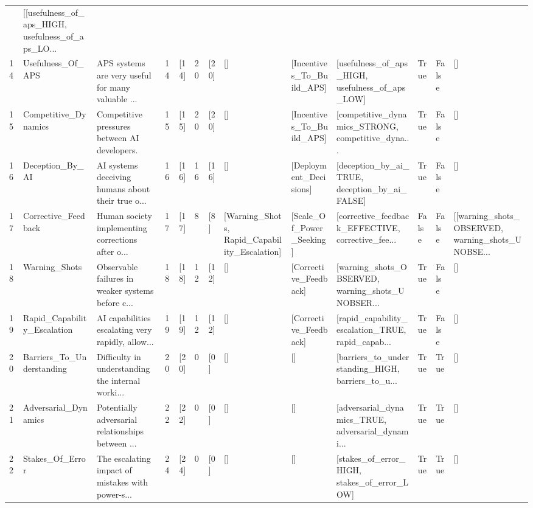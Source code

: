 \documentclass[
  11pt,
  letterpaper,
]{book}
\begin{document}
\begin{longtable}[]{@{}lllllllllllll@{}}
& {[}{[}usefulness\_of\_aps\_HIGH, usefulness\_of\_aps\_LO... \\
14 & Usefulness\_Of\_APS & APS systems are very useful for many valuable
... & 14 & {[}14{]} & 20 & {[}20{]} & {[}{]} &
{[}Incentives\_To\_Build\_APS{]} & {[}usefulness\_of\_aps\_HIGH,
usefulness\_of\_aps\_LOW{]} & True & False & {[}{]} \\
15 & Competitive\_Dynamics & Competitive pressures between AI
developers. & 15 & {[}15{]} & 20 & {[}20{]} & {[}{]} &
{[}Incentives\_To\_Build\_APS{]} & {[}competitive\_dynamics\_STRONG,
competitive\_dyna... & True & False & {[}{]} \\
16 & Deception\_By\_AI & AI systems deceiving humans about their true
o... & 16 & {[}16{]} & 16 & {[}16{]} & {[}{]} &
{[}Deployment\_Decisions{]} & {[}deception\_by\_ai\_TRUE,
deception\_by\_ai\_FALSE{]} & True & False & {[}{]} \\
17 & Corrective\_Feedback & Human society implementing corrections after
o... & 17 & {[}17{]} & 8 & {[}8{]} & {[}Warning\_Shots,
Rapid\_Capability\_Escalation{]} & {[}Scale\_Of\_Power\_Seeking{]} &
{[}corrective\_feedback\_EFFECTIVE, corrective\_fee... & False & False &
{[}{[}warning\_shots\_OBSERVED, warning\_shots\_UNOBSE... \\
18 & Warning\_Shots & Observable failures in weaker systems before c...
& 18 & {[}18{]} & 12 & {[}12{]} & {[}{]} & {[}Corrective\_Feedback{]} &
{[}warning\_shots\_OBSERVED, warning\_shots\_UNOBSER... & True & False &
{[}{]} \\
19 & Rapid\_Capability\_Escalation & AI capabilities escalating very
rapidly, allow... & 19 & {[}19{]} & 12 & {[}12{]} & {[}{]} &
{[}Corrective\_Feedback{]} & {[}rapid\_capability\_escalation\_TRUE,
rapid\_capab... & True & False & {[}{]} \\
20 & Barriers\_To\_Understanding & Difficulty in understanding the
internal worki... & 20 & {[}20{]} & 0 & {[}0{]} & {[}{]} & {[}{]} &
{[}barriers\_to\_understanding\_HIGH, barriers\_to\_u... & True & True &
{[}{]} \\
21 & Adversarial\_Dynamics & Potentially adversarial relationships
between ... & 22 & {[}22{]} & 0 & {[}0{]} & {[}{]} & {[}{]} &
{[}adversarial\_dynamics\_TRUE, adversarial\_dynami... & True & True &
{[}{]} \\
22 & Stakes\_Of\_Error & The escalating impact of mistakes with
power-s... & 24 & {[}24{]} & 0 & {[}0{]} & {[}{]} & {[}{]} &
{[}stakes\_of\_error\_HIGH, stakes\_of\_error\_LOW{]} & True & True &
{[}{]} \\
\end{longtable}
\end{document}

